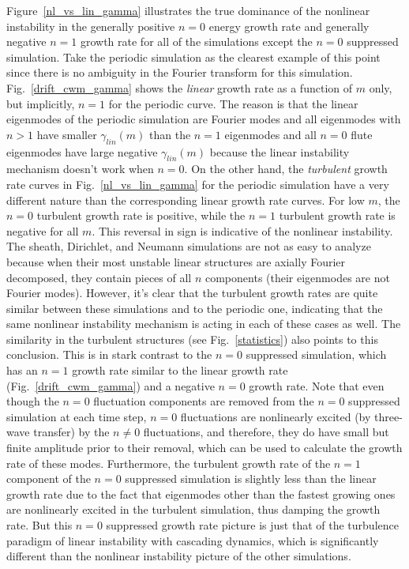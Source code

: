 \documentclass[showpacs,preprintnumbers,amsmath,amssymb,superscriptaddress,aip]{revtex4-1}
\begin{document}
Figure~\ref{nl_vs_lin_gamma} illustrates the true dominance of the nonlinear instability in the generally positive $n=0$ energy growth rate and generally negative $n=1$ growth rate for all of the simulations
except the $n=0$ suppressed simulation. Take the periodic simulation as the clearest example of this point since there is no ambiguity in the Fourier transform for this simulation. 
Fig.~\ref{drift_cwm_gamma} shows the \emph{linear} growth rate as a function of $m$ only, but implicitly, $n=1$ for the periodic curve. The reason is that the linear eigenmodes of the periodic simulation
are Fourier modes and all eigenmodes with $n>1$ have smaller $\gamma_{lin}(m)$ 
than the $n=1$ eigenmodes and all $n=0$ flute eigenmodes have large negative $\gamma_{lin}(m)$ because the linear instability mechanism doesn't work when $n=0$. On the other hand, the \emph{turbulent}
growth rate curves in Fig.~\ref{nl_vs_lin_gamma} for the periodic simulation have a very different nature than the corresponding linear growth rate curves.
For low $m$, the $n=0$ turbulent growth rate is positive, while the $n=1$ turbulent growth rate is negative for all $m$. This reversal in sign is indicative of the nonlinear instability.
The sheath, Dirichlet, and Neumann simulations are not as easy to analyze because when their most unstable linear structures are axially Fourier decomposed, they contain pieces of all $n$ components
(their eigenmodes are not Fourier modes).
However, it's clear that the turbulent growth rates are quite similar between these simulations and to the periodic one, indicating that the same nonlinear instability mechanism is acting in each of
these cases as well. The similarity in the turbulent structures (see Fig.~\ref{statistics}) also points to this conclusion.
This is in stark contrast to the $n=0$ suppressed simulation, which has an $n=1$
growth rate similar to the linear growth rate (Fig.~\ref{drift_cwm_gamma}) and a negative $n=0$ growth rate. Note that even though the $n=0$ fluctuation components are 
removed from the $n=0$ suppressed simulation at each time
step, $n=0$ fluctuations are nonlinearly excited (by three-wave transfer) by the $n \ne 0$ fluctuations, 
and therefore, they do have small but finite amplitude prior to their removal, which can be used to
calculate the growth rate of these modes. Furthermore, the turbulent growth rate of the $n=1$ component of the $n=0$ suppressed simulation is
slightly less than the linear growth rate due to the fact that eigenmodes other than the fastest growing ones are nonlinearly excited in the turbulent simulation, 
thus damping the growth rate.
But this $n=0$ suppressed growth rate picture is just that of the turbulence paradigm of linear instability with cascading dynamics, which is significantly different than the nonlinear
instability picture of the other simulations. 
\end{document}
